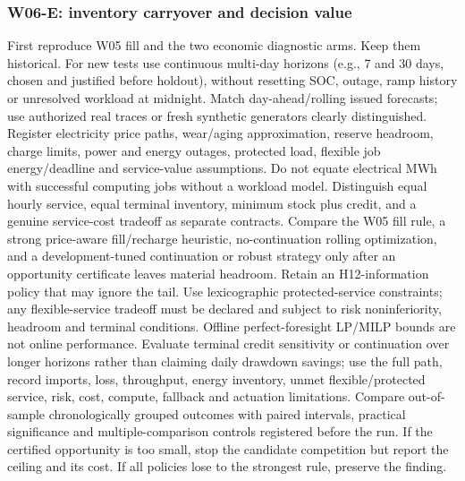 \documentclass[11pt,letterpaper]{article}
\begin{document}
\subsubsection{W06-E: inventory carryover and decision value}
First reproduce W05 fill and the two economic diagnostic arms. Keep them historical. For new tests use continuous multi-day horizons (e.g., 7 and 30 days, chosen and justified before holdout), without resetting SOC, outage, ramp history or unresolved workload at midnight. Match day-ahead/rolling issued forecasts; use authorized real traces or fresh synthetic generators clearly distinguished. Register electricity price paths, wear/aging approximation, reserve headroom, charge limits, power and energy outages, protected load, flexible job energy/deadline and service-value assumptions. Do not equate electrical MWh with successful computing jobs without a workload model. Distinguish equal hourly service, equal terminal inventory, minimum stock plus credit, and a genuine service-cost tradeoff as separate contracts. Compare the W05 fill rule, a strong price-aware fill/recharge heuristic, no-continuation rolling optimization, and a development-tuned continuation or robust strategy only after an opportunity certificate leaves material headroom. Retain an H12-information policy that may ignore the tail. Use lexicographic protected-service constraints; any flexible-service tradeoff must be declared and subject to risk noninferiority, headroom and terminal conditions. Offline perfect-foresight LP/MILP bounds are not online performance. Evaluate terminal credit sensitivity or continuation over longer horizons rather than claiming daily drawdown savings; use the full path, record imports, loss, throughput, energy inventory, unmet flexible/protected service, risk, cost, compute, fallback and actuation limitations. Compare out-of-sample chronologically grouped outcomes with paired intervals, practical significance and multiple-comparison controls registered before the run. If the certified opportunity is too small, stop the candidate competition but report the ceiling and its cost. If all policies lose to the strongest rule, preserve the finding.
\end{document}
